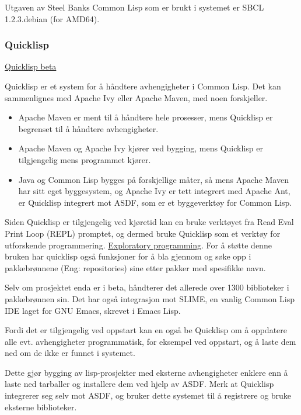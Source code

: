 \documentclass[11pt]{article}
\begin{document}
Utgaven av Steel Banks Common Lisp som er brukt i systemet er SBCL 1.2.3.debian (for AMD64).



\subsubsection{Quicklisp}
\href{(https://www.quicklisp.org/beta/}{Quicklisp beta}



Quicklisp er et system for å håndtere avhengigheter i Common Lisp. Det kan sammenlignes med Apache Ivy eller Apache Maven, med noen forskjeller.




\begin{itemize}
\item Apache Maven er ment til å håndtere hele prosesser, mens Quicklisp er begrenset til å håndtere avhengigheter.
\item Apache Maven og Apache Ivy kjører ved bygging, mens Quicklisp er tilgjengelig mens programmet kjører.
\item Java og Common Lisp bygges på forskjellige måter, så mens Apache Maven har sitt eget byggesystem, og Apache Ivy er tett integrert med Apache Ant, er Quicklisp integrert mot ASDF, som er et byggeverktøy for Common Lisp.
\end{itemize}




Siden Quicklisp er tilgjengelig ved kjøretid kan en bruke verktøyet fra Read Eval Print Loop (REPL) promptet, og dermed bruke Quicklisp som et verktøy for utforskende programmering. \href{(http://en.wikipedia.org/wiki/Exploratory(UNDERLINE programming}{Exploratory programming}. For å støtte denne bruken har quicklisp også funksjoner for å bla gjennom og søke opp i pakkebrønnene (Eng: repositories) sine etter pakker med spesifikke navn. 



Selv om prosjektet enda er i beta, håndterer det allerede over 1300 biblioteker i pakkebrønnen sin.
Det har også integrasjon mot SLIME, en vanlig Common Lisp IDE laget for GNU Emacs, skrevet i Emacs Lisp.



Fordi det er tilgjengelig ved oppstart kan en også be Quicklisp om å oppdatere alle evt. avhengigheter programmatisk, for eksempel ved oppstart, og å laste dem ned om de ikke er funnet i systemet.



Dette gjør bygging av lisp-prosjekter med eksterne avhengigheter enklere enn å laste ned tarballer og installere dem ved hjelp av ASDF. Merk at Quicklisp integrerer seg selv mot ASDF, og bruker dette systemet til å registrere og bruke eksterne biblioteker.
\end{document}
